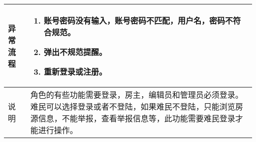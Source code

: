 \begin{table}[htbp]
\begin{tabular}{|l|l|l|l|}
        \hline
        异常流程                          & \multicolumn{3}{l|}{
            \begin{minipage}[t]{0.8\textwidth}
                \begin{enumerate}
                    \item 账号密码没有输入，账号密码不匹配，用户名，密码不符合规范。
                    \item 弹出不规范提醒。
                    \item 重新登录或注册。
                \end{enumerate}
                \vspace{.5em}
            \end{minipage}
        }                                                                                                                                                                          \\
        \hline
        说明                              & \multicolumn{3}{l|}{
        \begin{minipage}[t]{0.8\textwidth}
                角色的有些功能需要登录，房主，编辑员和管理员必须登录。难民可以选择登录或者不登陆，如果难民不登陆，只能浏览房源信息，不能举报，查看举报信息等，此功能需要难民登录才能进行操作。
                \vspace{.5em}
            \end{minipage} }                                                                                                                                               \\
        \hline
    \end{tabular}
\end{table}

